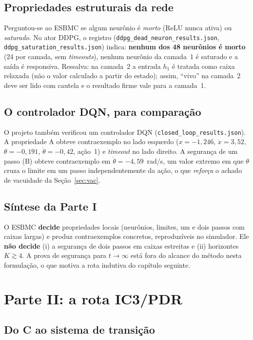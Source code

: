 \documentclass[12pt,openright,oneside,a4paper,chapter=TITLE,sumario=tradicional,english,brazil]{abntex2}
\begin{document}
\section{Propriedades estruturais da rede}

Perguntou-se ao ESBMC se algum neurônio é \emph{morto} (ReLU nunca ativa) ou \emph{saturado}. No ator DDPG, o registro (\texttt{ddpg\_dead\_neuron\_results.json}, \texttt{ddpg\_saturation\_results.json}) indica: \textbf{nenhum dos 48 neurônios é morto} (24 por camada, sem \emph{timeouts}), nenhum neurônio da camada~1 é saturado e a saída é responsiva. Ressalva: na camada~2 a entrada $h_1$ é tratada como caixa relaxada (não o valor calculado a partir do estado); assim, ``vivo'' na camada~2 deve ser lido com cautela e o resultado firme vale para a camada~1.

\section{O controlador DQN, para comparação}

O projeto também verificou um controlador DQN (\texttt{closed\_loop\_results.json}). A propriedade A obteve contraexemplo no lado esquerdo ($x{=}-1{,}246$, $\dot x{=}3{,}52$, $\theta{=}-0{,}191$, $\dot\theta{=}-0{,}42$, ação~1) e \emph{timeout} no lado direito. A segurança de um passo (B) obteve contraexemplo em $\dot\theta=-4{,}59$~rad/s, um valor extremo em que $\theta$ cruza o limite em um passo independentemente da ação, o que \emph{reforça} o achado de vacuidade da Seção~\ref{sec:vac}.

\section{Síntese da Parte I}

O ESBMC \textbf{decide} propriedades locais (neurônios, limites, um e dois passos com caixas largas) e produz contraexemplos concretos, reproduzíveis no simulador. Ele \textbf{não decide} (i) a segurança de dois passos em caixas estreitas e (ii) horizontes $K\gtrsim4$. A prova de segurança para $t\to\infty$ está fora do alcance do método nesta formulação, o que motiva a rota indutiva do capítulo seguinte.

\chapter{Parte II: a rota IC3/PDR}\label{cap:ic3}

\section{Do C ao sistema de transição}
\end{document}
